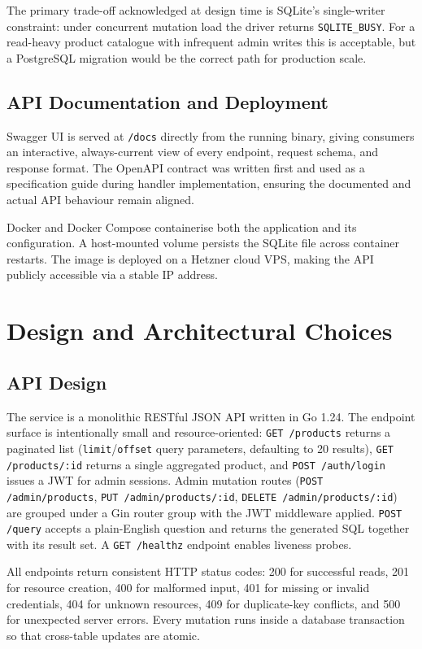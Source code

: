 \documentclass[8pt,a4paper]{article}
\begin{document}
The primary trade-off acknowledged at design time is SQLite's single-writer constraint: under concurrent mutation load the driver returns \texttt{SQLITE\_BUSY}. For a read-heavy product catalogue with infrequent admin writes this is acceptable, but a PostgreSQL migration would be the correct path for production scale.

\subsection{API Documentation and Deployment}
Swagger UI is served at \texttt{/docs} directly from the running binary, giving consumers an interactive, always-current view of every endpoint, request schema, and response format. The OpenAPI contract was written first and used as a specification guide during handler implementation, ensuring the documented and actual API behaviour remain aligned.

Docker and Docker Compose containerise both the application and its configuration. A host-mounted volume persists the SQLite file across container restarts. The image is deployed on a Hetzner cloud VPS, making the API publicly accessible via a stable IP address.

\section{Design and Architectural Choices}

\subsection{API Design}
The service is a monolithic RESTful JSON API written in Go 1.24. The endpoint surface is intentionally small and resource-oriented: \texttt{GET /products} returns a paginated list (\texttt{limit}/\texttt{offset} query parameters, defaulting to 20 results), \texttt{GET /products/:id} returns a single aggregated product, and \texttt{POST /auth/login} issues a JWT for admin sessions. Admin mutation routes (\texttt{POST /admin/products}, \texttt{PUT /admin/products/:id}, \texttt{DELETE /admin/products/:id}) are grouped under a Gin router group with the JWT middleware applied. \texttt{POST /query} accepts a plain-English question and returns the generated SQL together with its result set. A \texttt{GET /healthz} endpoint enables liveness probes.

All endpoints return consistent HTTP status codes: 200 for successful reads, 201 for resource creation, 400 for malformed input, 401 for missing or invalid credentials, 404 for unknown resources, 409 for duplicate-key conflicts, and 500 for unexpected server errors. Every mutation runs inside a database transaction so that cross-table updates are atomic.
\end{document}

